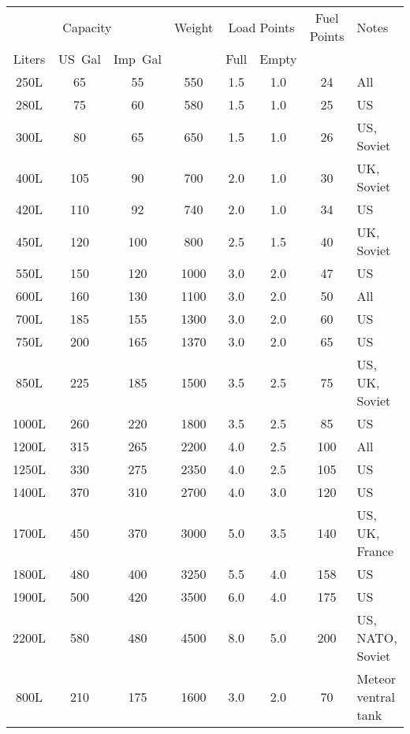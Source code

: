 \begin{twocolumntablefloat}
\begin{twocolumntable}
{
\begin{tabular}{cccccccl}
\toprule
\multicolumn{3}{c}{Capacity}&
Weight&
\multicolumn{2}{c}{Load Points}&
Fuel Points&
Notes\\
\cmidrule{1-3}
\cmidrule{5-6}
Liters&US~Gal&Imp~Gal&&Full&Empty&&\\
\midrule
\phantom{0}250L&\phantom{0}65&\phantom{0}55&\phantom{0}550&1.5&1.0&\phantom{0}24&All\\
\phantom{0}280L&\phantom{0}75&\phantom{0}60&\phantom{0}580&1.5&1.0&\phantom{0}25&US\\
\phantom{0}300L&\phantom{0}80&\phantom{0}65&\phantom{0}650&1.5&1.0&\phantom{0}26&US, Soviet\\
\phantom{0}400L&\phantom{}105&\phantom{0}90&\phantom{0}700&2.0&1.0&\phantom{0}30&UK, Soviet\\
\phantom{0}420L&\phantom{}110&\phantom{0}92&\phantom{0}740&2.0&1.0&\phantom{0}34&US\\
\phantom{0}450L&\phantom{}120&\phantom{}100&\phantom{0}800&2.5&1.5&\phantom{0}40&UK, Soviet\\
\phantom{0}550L&\phantom{}150&\phantom{}120&\phantom{}1000&3.0&2.0&\phantom{0}47&US\\
\phantom{0}600L&\phantom{}160&\phantom{}130&\phantom{}1100&3.0&2.0&\phantom{0}50&All\\
\phantom{0}700L&\phantom{}185&\phantom{}155&\phantom{}1300&3.0&2.0&\phantom{0}60&US\\
\phantom{0}750L&\phantom{}200&\phantom{}165&\phantom{}1370&3.0&2.0&\phantom{0}65&US\\
\phantom{0}850L&\phantom{}225&\phantom{}185&\phantom{}1500&3.5&2.5&\phantom{0}75&US, UK, Soviet\\
\phantom{}1000L&\phantom{}260&\phantom{}220&\phantom{}1800&3.5&2.5&\phantom{0}85&US\\
\phantom{}1200L&\phantom{}315&\phantom{}265&\phantom{}2200&4.0&2.5&\phantom{}100&All\\
\phantom{}1250L&\phantom{}330&\phantom{}275&\phantom{}2350&4.0&2.5&\phantom{}105&US\\
\phantom{}1400L&\phantom{}370&\phantom{}310&\phantom{}2700&4.0&3.0&\phantom{}120&US\\
\phantom{}1700L&\phantom{}450&\phantom{}370&\phantom{}3000&5.0&3.5&\phantom{}140&US, UK, France\\
\phantom{}1800L&\phantom{}480&\phantom{}400&\phantom{}3250&5.5&4.0&\phantom{}158&US\\
\phantom{}1900L&\phantom{}500&\phantom{}420&\phantom{}3500&6.0&4.0&\phantom{}175&US\\
\phantom{}2200L&\phantom{}580&\phantom{}480&\phantom{}4500&8.0&5.0&\phantom{}200&US, NATO, Soviet\\
\midrule
\phantom{0}800L&\phantom{}210&\phantom{}175&\phantom{}1600&3.0&2.0&\phantom{0}70&Meteor ventral tank\\
\bottomrule
\end{tabular}

}
\end{twocolumntable}
\end{twocolumntablefloat}